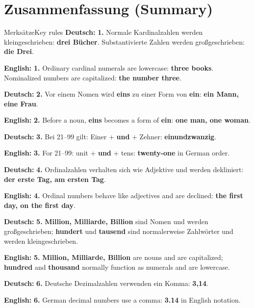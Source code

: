\documentclass[a4paper,11pt]{article}
\newcommand{\GermanText}[1]{\textbf{Deutsch: }#1\par}
\newcommand{\EnglishText}[1]{{\small\color{SoftGray}\textbf{English: }#1\par}}
\begin{document}
\section{Zusammenfassung \textnormal{(Summary)}}
\begin{grammarentry}{Merksätze}{Key rules}
\GermanText{\textbf{1.} Normale Kardinalzahlen werden kleingeschrieben: \textbf{drei Bücher}. Substantivierte Zahlen werden großgeschrieben: \textbf{die Drei}.}
\EnglishText{\textbf{1.} Ordinary cardinal numerals are lowercase: \textbf{three books}. Nominalized numbers are capitalized: \textbf{the number three}.}
\GermanText{\textbf{2.} Vor einem Nomen wird \textbf{eins} zu einer Form von \textbf{ein}: \textbf{ein Mann, eine Frau}.}
\EnglishText{\textbf{2.} Before a noun, \textbf{eins} becomes a form of \textbf{ein}: \textbf{one man, one woman}.}
\GermanText{\textbf{3.} Bei 21--99 gilt: Einer + \textbf{und} + Zehner: \textbf{einundzwanzig}.}
\EnglishText{\textbf{3.} For 21--99: unit + \textbf{und} + tens: \textbf{twenty-one} in German order.}
\GermanText{\textbf{4.} Ordinalzahlen verhalten sich wie Adjektive und werden dekliniert: \textbf{der erste Tag, am ersten Tag}.}
\EnglishText{\textbf{4.} Ordinal numbers behave like adjectives and are declined: \textbf{the first day, on the first day}.}
\GermanText{\textbf{5.} \textbf{Million, Milliarde, Billion} sind Nomen und werden großgeschrieben; \textbf{hundert} und \textbf{tausend} sind normalerweise Zahlwörter und werden kleingeschrieben.}
\EnglishText{\textbf{5.} \textbf{Million, Milliarde, Billion} are nouns and are capitalized; \textbf{hundred} and \textbf{thousand} normally function as numerals and are lowercase.}
\GermanText{\textbf{6.} Deutsche Dezimalzahlen verwenden ein Komma: \textbf{3,14}.}
\EnglishText{\textbf{6.} German decimal numbers use a comma: \textbf{3.14} in English notation.}
\end{grammarentry}
\end{document}
